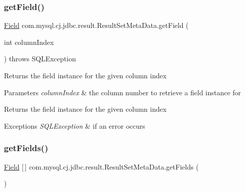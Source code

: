 \subsubsection{\texorpdfstring{get\+Field()}{getField()}}
{\footnotesize\ttfamily \mbox{\hyperlink{classcom_1_1mysql_1_1cj_1_1result_1_1_field}{Field}} com.\+mysql.\+cj.\+jdbc.\+result.\+Result\+Set\+Meta\+Data.\+get\+Field (\begin{DoxyParamCaption}\item[{int}]{column\+Index }\end{DoxyParamCaption}) throws S\+Q\+L\+Exception\hspace{0.3cm}{\ttfamily [protected]}}

Returns the field instance for the given column index


\begin{DoxyParams}{Parameters}
{\em column\+Index} & the column number to retrieve a field instance for\\
\hline
\end{DoxyParams}
\begin{DoxyReturn}{Returns}
the field instance for the given column index
\end{DoxyReturn}

\begin{DoxyExceptions}{Exceptions}
{\em S\+Q\+L\+Exception} & if an error occurs \\
\hline
\end{DoxyExceptions}
\mbox{\label{classcom_1_1mysql_1_1cj_1_1jdbc_1_1result_1_1_result_set_meta_data_a2c1182d90a57279d40706dec8ce2f096}} 
\subsubsection{\texorpdfstring{get\+Fields()}{getFields()}}
{\footnotesize\ttfamily \mbox{\hyperlink{classcom_1_1mysql_1_1cj_1_1result_1_1_field}{Field}} \mbox{[}$\,$\mbox{]} com.\+mysql.\+cj.\+jdbc.\+result.\+Result\+Set\+Meta\+Data.\+get\+Fields (\begin{DoxyParamCaption}{ }\end{DoxyParamCaption})}


